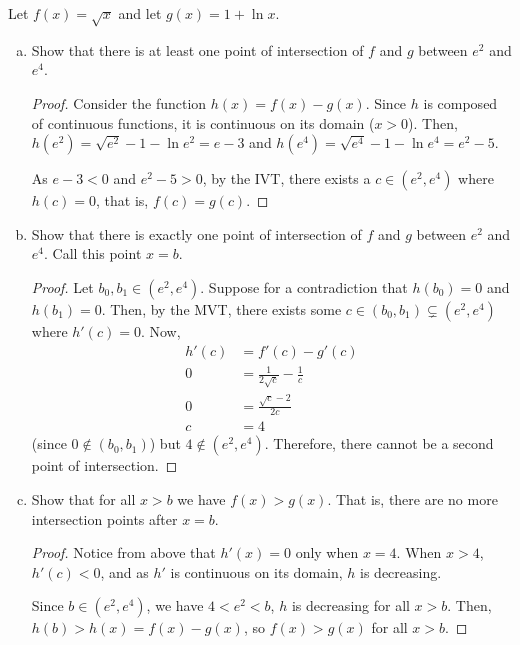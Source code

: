 \documentclass{agony}
\begin{document}
\question Let $f(x) = \sqrt{x}$ and let $g(x) = 1 + \ln x$.
\begin{enumerate}[(a)]
  \item Show that there is at least one point of intersection of $f$ and $g$ between $e^2$ and $e^4$.
        \begin{proof}
          Consider the function $h(x) = f(x) - g(x)$.
          Since $h$ is composed of continuous functions, it is continuous on its domain ($x > 0$).
          Then, $h(e^2) = \sqrt{e^2} - 1 - \ln e^2 = e-3$ and $h(e^4) = \sqrt{e^4} - 1 - \ln e^4 = e^2-5$.

          As $e-3 < 0$ and $e^2-5 > 0$, by the IVT, there exists a $c\in(e^2,e^4)$ where $h(c)=0$,
          that is, $f(c) = g(c)$.
        \end{proof}
  \item Show that there is exactly one point of intersection of $f$ and $g$ between $e^2$ and $e^4$.
        Call this point $x=b$.
        \begin{proof}
          Let $b_0,b_1\in(e^2,e^4)$.
          Suppose for a contradiction that $h(b_0) = 0$ and $h(b_1) = 0$.
          Then, by the MVT, there exists some $c\in(b_0,b_1)\subsetneq(e^2,e^4)$ where $h'(c) = 0$.
          Now,
          \begin{align*}
            h'(c) & = f'(c) - g'(c)                     \\
            0     & = \frac{1}{2\sqrt{c}} - \frac{1}{c} \\
            0     & = \frac{\sqrt{c} - 2}{2c}           \\
            c     & = 4
          \end{align*}
          (since $0 \not\in(b_0,b_1)$) but $4 \not\in (e^2,e^4)$.
          Therefore, there cannot be a second point of intersection.
        \end{proof}
  \item Show that for all $x > b$ we have $f(x) > g(x)$.
        That is, there are no more intersection points after $x=b$.
        \begin{proof}
          Notice from above that $h'(x) = 0$ only when $x=4$.
          When $x > 4$, $h'(c) < 0$, and as $h'$ is continuous on its domain, $h$ is decreasing.

          Since $b \in (e^2,e^4)$, we have $4 < e^2 < b$, $h$ is decreasing for all $x>b$.
          Then, $h(b) > h(x) = f(x)-g(x)$, so $f(x) > g(x)$ for all $x > b$.
        \end{proof}
\end{enumerate}
\end{document}
